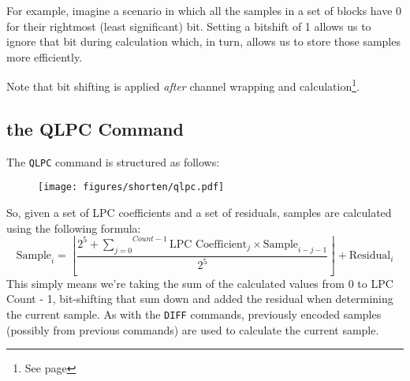 For example, imagine a scenario in which all the samples in a set of
blocks have 0 for their rightmost (least significant) bit.
Setting a bitshift of 1 allows us to ignore that bit during
calculation which, in turn, allows us to store those samples more
efficiently.

Note that bit shifting is applied \textit{after} channel wrapping
and  calculation\footnote{See page \pageref{shorten_coffset}}.

\pagebreak

\subsection{the QLPC Command}

The \texttt{QLPC} command is structured as follows:

\begin{figure}[h]
\texttt{[image: figures/shorten/qlpc.pdf]}
\end{figure}
\par
\noindent
So, given a set of LPC coefficients and a set of residuals,
samples are calculated using the following formula:
\begin{equation}
\text{Sample}_i = \left\lfloor \frac{2 ^ 5 + \overset{Count - 1}{\underset{j = 0}{\sum}}
  \text{LPC Coefficient}_j \times \text{Sample}_{i - j - 1} } {2 ^ 5}\right\rfloor + \text{Residual}_i
\end{equation}
This simply means we're taking the sum of the calculated values from
0 to LPC Count - 1, bit-shifting that sum down and added the residual
when determining the current sample.
As with the \texttt{DIFF} commands, previously encoded samples
(possibly from previous commands) are used to calculate the current
sample.

